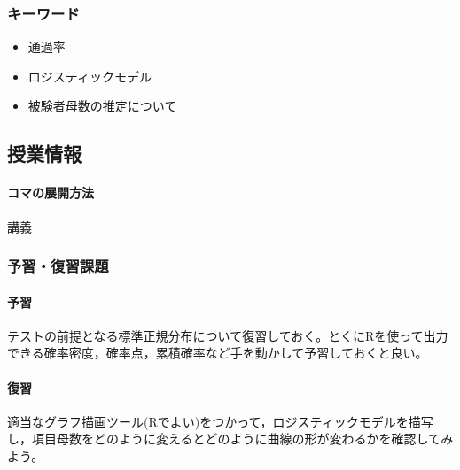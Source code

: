 \subsubsection{キーワード}
\begin{itemize}
	\item 通過率
	\item ロジスティックモデル
	\item 被験者母数の推定について
\end{itemize}
\subsection{授業情報}
\paragraph{コマの展開方法}
講義
\subsubsection{予習・復習課題}
\paragraph{予習} テストの前提となる標準正規分布について復習しておく。とくにRを使って出力できる確率密度，確率点，累積確率など手を動かして予習しておくと良い。
\paragraph{復習} 適当なグラフ描画ツール(Rでよい)をつかって，ロジスティックモデルを描写し，項目母数をどのように変えるとどのように曲線の形が変わるかを確認してみよう。
